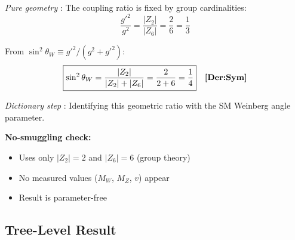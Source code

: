 \begin{tcolorbox}[colback=green!5!white, colframe=green!50!black,
    title=\textbf{Partition Counting Derivation}]

\textit{Pure geometry} \tagDerSym{}:
The coupling ratio is fixed by group cardinalities:
\begin{equation}
\frac{g'^2}{g^2} = \frac{|Z_2|}{|Z_6|} = \frac{2}{6} = \frac{1}{3}
\label{eq:coupling_ratio_partition}
\end{equation}

From $\sin^2\theta_W \equiv g'^2/(g^2 + g'^2)$:
\begin{equation}
\boxed{\sin^2\theta_W = \frac{|Z_2|}{|Z_2| + |Z_6|} = \frac{2}{2+6} = \frac{1}{4}} \quad \textbf{[Der:Sym]}{}
\label{eq:weinberg_partition}
\end{equation}

\textit{Dictionary step} \tagDc{}:
Identifying this geometric ratio with the SM Weinberg angle parameter.

\medskip
\textbf{No-smuggling check:}
\begin{itemize}[nosep]
\item[$\checkmark$] Uses only $|Z_2| = 2$ and $|Z_6| = 6$ (group theory)
\item[$\checkmark$] No measured values ($M_W$, $M_Z$, $v$) appear
\item[$\checkmark$] Result is parameter-free
\end{itemize}
\end{tcolorbox}

\subsection{Tree-Level Result}

